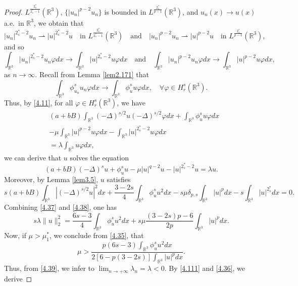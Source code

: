\documentclass[11pt]{article}
\numberwithin{equation}{section}
\begin{document}
\begin{proof}
$L^{\frac{2^*_s}{2^*_s-1}}(\mathbb{R}^3)$,  $\{|u_n|^{p-2}u_n\}$ is bounded in 
$L^{\frac{2^*_s}{p-1}}(\mathbb{R}^3)$, and $u_n(x)\to u(x)$ a.e.\ in $\mathbb{R}^3$, 
we obtain that
$$
|u_n|^{2^*_s-2}u_n\rightharpoonup|u|^{2^*_s-2}u \quad \text{in } 
L^{\frac{2^*_s}{2^*_s-1}}(\mathbb{R}^3)\quad \text{and} \quad
|u_n|^{p-2}u_n\rightharpoonup|u|^{p-2}u \quad \text{in }L^{\frac{2^*_s}{p-1}}(\mathbb{R}^3),
$$
and so
$$
\int_{\mathbb{R}^3}|u_n|^{2^*_s-2}u_n\varphi dx
\to\int_{\mathbb{R}^3}|u|^{2^*_s-2}u\varphi dx \quad\text{and}\quad
\int_{\mathbb{R}^3}|u_n|^{p-2}u_n\varphi dx
\to\int_{\mathbb{R}^3}|u|^{p-2}u\varphi dx,
$$
as $n\to \infty$. Recall from Lemma \ref{lem2.171} that
$$
\int_{\mathbb{R}^3} \phi^s_{u_n}u_n\varphi dx
\to \int_{\mathbb{R}^3} \phi^s_{u}u\varphi dx, \quad
 \forall \varphi \in H^s_{r}(\mathbb{R}^3).
$$
Thus,  by \eqref{4.11}, for all $\varphi \in H^s_{r}(\mathbb{R}^3)$, we have
\begin{equation}\label{4.36}
\begin{split}
&(a+bB)\int_{\mathbb{R}^3}(-\Delta)^{s/2}u(-\Delta)^{s/2}\varphi dx+\int_{\mathbb{R}^3}\phi^s_{u}u\varphi dx\\
&-\mu \int_{\mathbb{R}^3}|u|^{p-2}u\varphi dx
 -\int_{\mathbb{R}^3}|u|^{2^*_s-2}u\varphi dx \\
&=\lambda \int_{\mathbb{R}^3} u\varphi dx,
\end{split}
\end{equation}
we can derive that $u$ solves the   equation
\begin{equation}\label{4.37}
(a+bB)(-\Delta)^su+\phi^s_{u}u-\mu |u|^{q-2}u-|u|^{2^*_s-2}u=\lambda u.
\end{equation}
 Moreover, by Lemma \ref{lem3.5}, $u$ satisfies
\begin{equation}\label{4.38}
s(a+bB)\int_{\mathbb{R}^3}|(-\Delta)^{s/2}u|^2dx+\frac{3-2s}{4}\int_{\mathbb{R}^3}
 \phi^s_u u^2dx
-s\mu \delta_{p,s}\int_{\mathbb{R}^3}|u|^pdx-s\int_{\mathbb{R}^3}|u|^{2^*_s}dx=0.
\end{equation}
Combining \eqref{4.37} and \eqref{4.38}, one has
\begin{equation}\label{4.39}
s\lambda\|u\|^2_2=\frac{6s-3}{4}\int_{\mathbb{R}^3}\phi^s_u u^2dx+s\mu \frac{(3-2s)p-6}{2p}\int_{\mathbb{R}^3}|u|^pdx.
\end{equation}
Now, if $\mu>\mu^*_1$, we conclude from \eqref{4.35}, that
\[
\mu >\frac{p(6s-3)\int_{\mathbb{R}^3}\phi^s_{u} u^2dx}{2[6-p(3-2s)]
\int_{\mathbb{R}^3}|u|^pdx}.
\]
Thus, from \eqref{4.39}, we infer to $\lim_{n\to+\infty}\lambda_n=\lambda<0$.
 By \eqref{4.111} and \eqref{4.36}, we derive

\end{proof}
\end{document}
